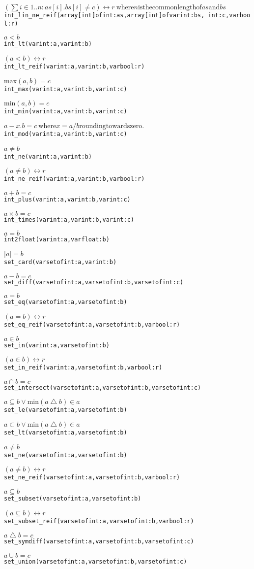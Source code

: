 \documentclass[a4paper]{article}
\begin{document}
\begin{alltt}
\((\sum i\in{}1..n: as[i].bs[i] \neq c) \leftrightarrow r\
\mathrm{ where} n \mathrm{is the common length of} as \mathrm{and} bs\)
int_lin_ne_reif(array [int] of int: as, array [int] of var int: bs, \
    int: c, var bool: r)

\(a < b\)
int_lt(var int: a, var int: b)

\((a < b) \leftrightarrow r\)
int_lt_reif(var int: a, var int: b, var bool: r)

\(\mathrm{max}(a, b) = c\)
int_max(var int: a, var int: b, var int: c)

\(\mathrm{min}(a, b) = c\)
int_min(var int: a, var int: b, var int: c)

\(a-x.b = c\
\mathrm{ where} x = a/b \mathrm{rounding towards zero.}\)
int_mod(var int: a, var int: b, var int: c)

\(a \neq b\)
int_ne(var int: a, var int: b)

\((a \neq b) \leftrightarrow r\)
int_ne_reif(var int: a, var int: b, var bool: r)

\(a+b = c\)
int_plus(var int: a, var int: b, var int: c)

\(a\times{}b = c\)
int_times(var int: a, var int: b, var int: c)

\(a = b\)
int2float(var int: a, var float: b)

\(|a| = b\)
set_card(var set of int: a, var int: b)

\(a-b = c\)
set_diff(var set of int: a, var set of int: b, var set of int: c)

\(a = b\)
set_eq(var set of int: a, var set of int: b)

\((a = b) \leftrightarrow r\)
set_eq_reif(var set of int: a, var set of int: b, var bool: r)

\(a\in{}b\)
set_in(var int: a, var set of int: b)

\((a\in{}b) \leftrightarrow r\)
set_in_reif(var int: a, var set of int: b, var bool: r)

\(a\cap{}b = c\)
set_intersect(var set of int: a, var set of int: b, var set of int: c)

\(a \subseteq b \vee \mathrm{min}(a\bigtriangleup{}b)\in{}a\)
set_le(var set of int: a, var set of int: b)

\(a \subset b \vee \mathrm{min}(a\bigtriangleup{}b)\in{}a\)
set_lt(var set of int: a, var set of int: b)

\(a \neq b\)
set_ne(var set of int: a, var set of int: b)

\((a \neq b) \leftrightarrow r\)
set_ne_reif(var set of int: a, var set of int: b, var bool: r)

\(a\subseteq{}b\)
set_subset(var set of int: a, var set of int: b)

\((a\subseteq{}b) \leftrightarrow r\)
set_subset_reif(var set of int: a, var set of int: b, var bool: r)

\(a\bigtriangleup{}b = c\)
set_symdiff(var set of int: a, var set of int: b, var set of int: c)

\(a\cup{}b = c\)
set_union(var set of int: a, var set of int: b, var set of int: c)
\end{alltt}
\end{document}
